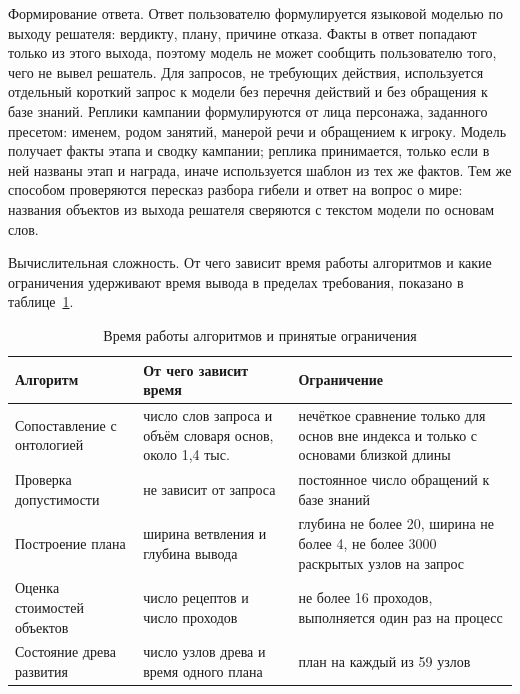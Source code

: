 Формирование ответа. Ответ пользователю формулируется языковой моделью по выходу
решателя: вердикту, плану, причине отказа. Факты в ответ попадают только из этого
выхода, поэтому модель не может сообщить пользователю того, чего не вывел решатель.
Для запросов, не требующих действия, используется отдельный короткий запрос к модели
без перечня действий и без обращения к базе знаний. Реплики кампании формулируются от
лица персонажа, заданного пресетом: именем, родом занятий, манерой речи и обращением
к игроку. Модель получает факты этапа и сводку кампании; реплика принимается, только
если в ней названы этап и награда, иначе используется шаблон из тех же фактов. Тем же
способом проверяются пересказ разбора гибели и ответ на вопрос о мире: названия объектов
из выхода решателя сверяются с текстом модели по основам слов.

Вычислительная сложность. От чего зависит время работы алгоритмов и какие ограничения
удерживают время вывода в пределах требования, показано в таблице~\ref{tab:complexity}.

\begin{table}[!htb]
  \centering
  \caption{Время работы алгоритмов и принятые ограничения}
  \label{tab:complexity}
  \begin{tabular}{|>{\raggedright\arraybackslash}p{}
                  |>{\raggedright\arraybackslash}p{}
                  |>{\raggedright\arraybackslash}p{}|}
    \hline
    Алгоритм & От чего зависит время & Ограничение \\
    \hline
    Сопоставление с онтологией & число слов запроса и объём словаря основ, около 1,4 тыс. & нечёткое сравнение только для основ вне индекса и только с основами близкой длины \\
    \hline
    Проверка допустимости & не зависит от запроса & постоянное число обращений к базе знаний \\
    \hline
    Построение плана & ширина ветвления и глубина вывода & глубина не более 20, ширина не более 4, не более 3000 раскрытых узлов на запрос \\
    \hline
    Оценка стоимостей объектов & число рецептов и число проходов & не более 16 проходов, выполняется один раз на процесс \\
    \hline
    Состояние древа развития & число узлов древа и время одного плана & план на каждый из 59 узлов \\
    \hline
  \end{tabular}
\end{table}

